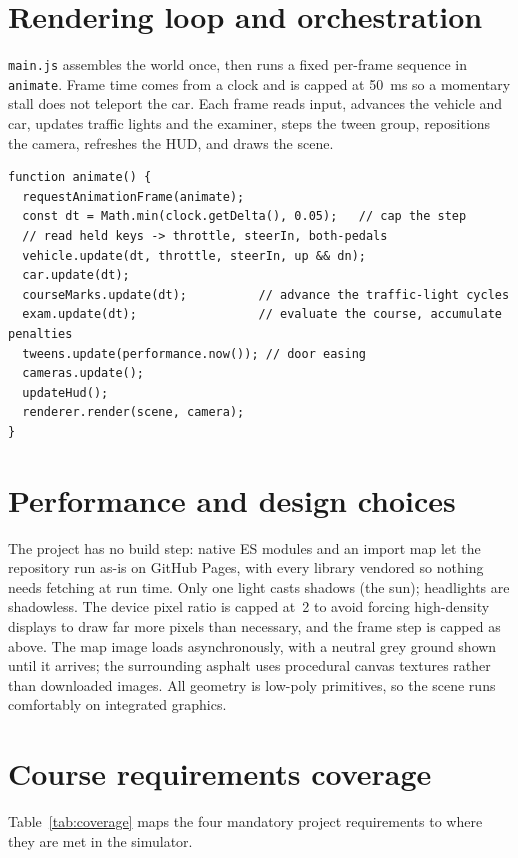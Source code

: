 \documentclass[11pt]{article}
\newcommand{\code}[1]{\texttt{#1}}
\begin{document}
\section{Rendering loop and orchestration}

\code{main.js} assembles the world once, then runs a fixed per-frame sequence in
\code{animate}. Frame time comes from a clock and is capped at \SI{50}{ms} so a
momentary stall does not teleport the car. Each frame reads input, advances the
vehicle and car, updates traffic lights and the examiner, steps the tween group,
repositions the camera, refreshes the HUD, and draws the scene.

\begin{lstlisting}[caption={Per-frame order (\code{main.js}).}]
function animate() {
  requestAnimationFrame(animate);
  const dt = Math.min(clock.getDelta(), 0.05);   // cap the step
  // read held keys -> throttle, steerIn, both-pedals
  vehicle.update(dt, throttle, steerIn, up && dn);
  car.update(dt);
  courseMarks.update(dt);          // advance the traffic-light cycles
  exam.update(dt);                 // evaluate the course, accumulate penalties
  tweens.update(performance.now()); // door easing
  cameras.update();
  updateHud();
  renderer.render(scene, camera);
}
\end{lstlisting}

\section{Performance and design choices}

The project has no build step: native ES modules and an import map let the
repository run as-is on GitHub Pages, with every library vendored so nothing needs
fetching at run time. Only one light casts shadows (the sun); headlights are
shadowless. The device pixel ratio is capped at~2 to avoid forcing high-density
displays to draw far more pixels than necessary, and the frame step is capped as
above. The map image loads asynchronously, with a neutral grey ground shown until
it arrives; the surrounding asphalt uses procedural canvas textures rather than
downloaded images. All geometry is low-poly primitives, so the scene runs
comfortably on integrated graphics.

\section{Course requirements coverage}

Table~\ref{tab:coverage} maps the four mandatory project requirements to where
they are met in the simulator.
\end{document}
